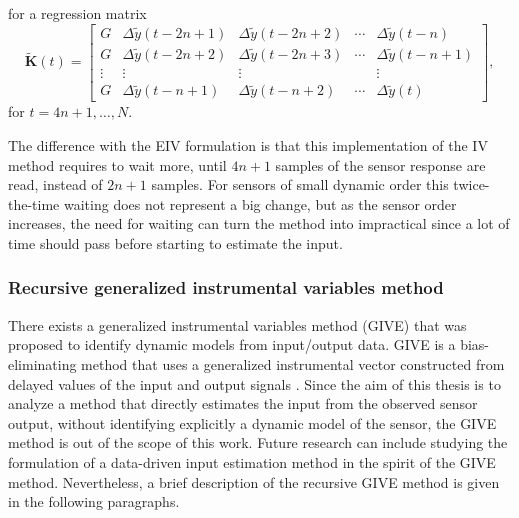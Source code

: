 for a regression matrix
\begin{equation} \widetilde{\mathbf{K}}(t) = \begin{bmatrix} G & \Delta \widetilde{y}(t-2n+1) & \Delta \widetilde{y}(t-2n+2) & \cdots & \Delta \widetilde{y}(t-n) \\ G & \Delta \widetilde{y}(t-2n+2) & \Delta \widetilde{y}(t-2n+3) & \cdots & \Delta \widetilde{y}(t-n+1) \\ \vdots & \vdots & \vdots & & \vdots \\ G & \Delta \widetilde{y}(t-n+1) & \Delta \widetilde{y}(t-n+2) & \cdots & \Delta \widetilde{y}(t) \end{bmatrix} , \label{eqn:matrixK_t} \end{equation}
for $t = 4n+1, \ldots, N$.

The difference with the EIV formulation is that this implementation of the IV method requires to wait more, until $4n+1$ samples of the sensor response are read, instead of $2n+1$ samples. 
For sensors of small dynamic order this twice-the-time waiting does not represent a big change, but as the sensor order increases, the need for waiting can turn the method into impractical since a lot of time should pass before starting to estimate the input. 
        
\subsubsection{Recursive generalized instrumental variables method}

There exists a generalized instrumental variables method (GIVE) that was proposed to identify dynamic models from input/output data. 
GIVE is a bias-eliminating method that uses a generalized instrumental vector constructed from delayed values of the input and output signals \cite{Soderstrom18}.
Since the aim of this thesis is to analyze a method that directly estimates the input from the observed sensor output, without identifying explicitly a dynamic model of the sensor, the GIVE method is out of the scope of this work. 
Future research can include studying the formulation of a data-driven input estimation method in the spirit of the GIVE method. 
Nevertheless, a brief description of the recursive GIVE method is given in the following paragraphs.


